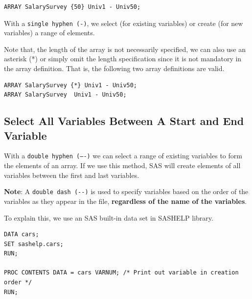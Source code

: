 \documentclass[
]{book}
\begin{document}
\begin{verbatim}
ARRAY SalarySurvey {50} Univ1 - Univ50;
\end{verbatim}

With a \texttt{single\ hyphen\ (-)}, we select (for existing variables) or create (for new variables) a range of elements.

Note that, the length of the array is not necessarily specified, we can also use an asterisk (*) or simply omit the length specification since it is not mandatory in the array definition. That is, the following two array definitions are valid.

\begin{verbatim}
ARRAY SalarySurvey {*} Univ1 - Univ50;
ARRAY SalarySurvey  Univ1 - Univ50;
\end{verbatim}

\hypertarget{select-all-variables-between-a-start-and-end-variable}{%
\subsection{Select All Variables Between A Start and End Variable}\label{select-all-variables-between-a-start-and-end-variable}}

With a \texttt{double\ hyphen\ (–-)} we can select a range of existing variables to form the elements of an array. If we use this method, SAS will create elements of all variables between the first and last variables.

\textbf{Note}: A \texttt{double\ dash\ (-\/-)} is used to specify variables based on the order of the variables as they appear in the file, \textbf{regardless of the name of the variables}.

To explain this, we use an SAS built-in data set in SASHELP library.

\begin{verbatim}
DATA cars;
SET sashelp.cars;
RUN;

PROC CONTENTS DATA = cars VARNUM; /* Print out variable in creation order */
RUN;
\end{verbatim}
\end{document}
